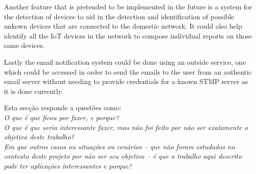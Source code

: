 Another feature that is pretended to be implemented in the future is a system
for the detection of devices to aid in the detection and identification of
possible unkown devices that are connected to the domestic network. It could
also help identify all the IoT devices in the network to compose individual
reports on those same devices.

Lastly the email notification system could be done using an outside service, one
which could be accessed in order to send the emails to the user from an
authentic email server without needing to provide credentials for a known STMP
server as it is done currently.

Esta secção responde a questões como:\\
\emph{O que é que ficou por fazer, e porque?}\\
\emph{O que é que seria interessante fazer, mas não foi feito por não ser exatamente o objetivo deste trabalho?}\\
\emph{Em que outros casos ou situações ou cenários -- que não foram estudados no contexto deste projeto por não ser seu objetivo -- é que o trabalho aqui descrito pode ter aplicações interessantes e porque?}
